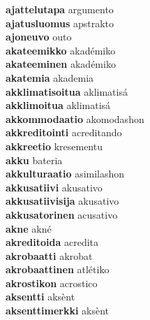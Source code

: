 \textbf{ajattelutapa } argumento \\
\textbf{ajatusluomus } apstrakto \\
\textbf{ajoneuvo } outo \\
\textbf{akateemikko } akadémiko \\
\textbf{akateeminen } akadémiko \\
\textbf{akatemia } akademia \\
\textbf{akklimatisoitua } aklimatisá \\
\textbf{akklimoitua } aklimatisá \\
\textbf{akkommodaatio } akomodashon \\
\textbf{akkreditointi } acreditando \\
\textbf{akkreetio } kresementu \\
\textbf{akku } bateria \\
\textbf{akkulturaatio } asimilashon \\
\textbf{akkusatiivi } akusativo \\
\textbf{akkusatiivisija } akusativo \\
\textbf{akkusatorinen } acusativo \\
\textbf{akne } akné \\
\textbf{akreditoida } acredita \\
\textbf{akrobaatti } akrobat \\
\textbf{akrobaattinen } atlétiko \\
\textbf{akrostikon } acrostico \\
\textbf{aksentti } aksènt \\
\textbf{aksenttimerkki } aksènt \\
